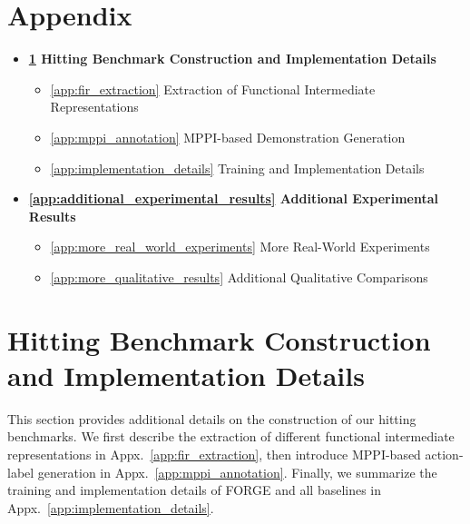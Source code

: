 \appendix

\section*{Appendix}


\begin{itemize}
  \item[] \textbf{\ref{app:hitting_benchmarks} Hitting Benchmark Construction and Implementation Details}
    \begin{itemize}
      \item[] \ref{app:fir_extraction} Extraction of Functional Intermediate Representations
      \item[] \ref{app:mppi_annotation} MPPI-based Demonstration Generation
      \item[] \ref{app:implementation_details} Training and Implementation Details
    \end{itemize}
    
  \item[] \textbf{\ref{app:additional_experimental_results} Additional Experimental Results}
    \begin{itemize}
      \item[] \ref{app:more_real_world_experiments} More Real-World Experiments
      \item[] \ref{app:more_qualitative_results} Additional Qualitative Comparisons
    \end{itemize}
\end{itemize}



\section{Hitting Benchmark Construction and Implementation Details}
\label{app:hitting_benchmarks}
This section provides additional details on the construction of our hitting benchmarks. We first describe the extraction of different functional intermediate representations in Appx.~\ref{app:fir_extraction}, then introduce MPPI-based action-label generation in Appx.~\ref{app:mppi_annotation}. Finally, we summarize the training and implementation details of FORGE and all baselines in Appx.~\ref{app:implementation_details}.

